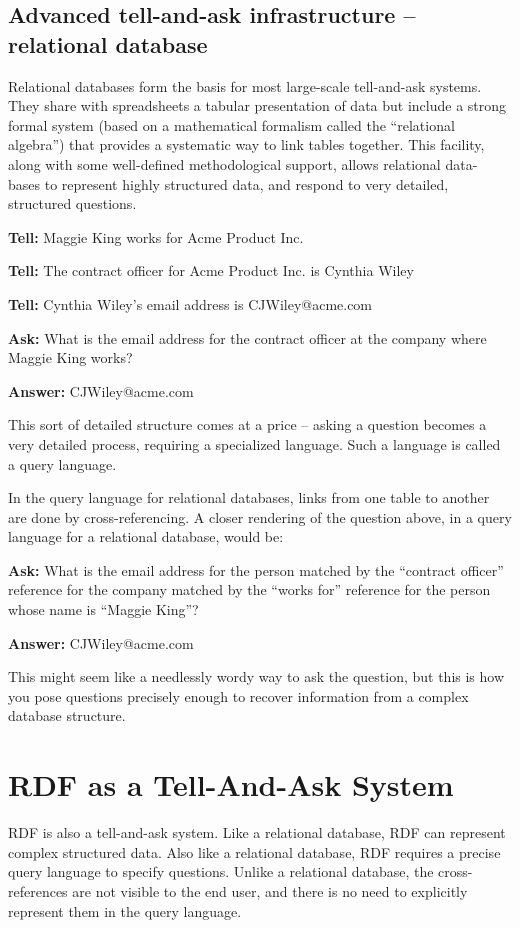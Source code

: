 \subsection{Advanced tell-and-ask infrastructure -- relational database}

Relational databases form the basis for most large-scale tell-and-ask
systems. They share with spreadsheets a tabular presentation of data but
include a strong formal system (based on a mathematical formalism called
the ``relational algebra'') that provides a systematic way to link
tables together. This facility, along with some well-defined
methodological support, allows relational data- bases to represent
highly structured data, and respond to very detailed, structured
questions.

\textbf{Tell:} Maggie King works for Acme Product Inc.

\textbf{Tell:} The contract officer for Acme Product Inc. is Cynthia Wiley

\textbf{Tell:} Cynthia Wiley's email address is
CJWiley@acme.com

\textbf{Ask:} What is the email address for the contract officer at the company
where Maggie King works?

\textbf{Answer:}
CJWiley@acme.com

This sort of detailed structure comes at a price -- asking a question
becomes a very detailed process, requiring a specialized language. Such
a language is called a query language.

In the query language for relational databases, links from one table to
another are done by cross-referencing.  A closer rendering of the
question above, in a query language for a relational database, would be:

\textbf{Ask:} What is the email address for the person matched by the ``contract
officer'' reference for the company matched by the ``works for''
reference for the person whose name is ``Maggie King''? 

\textbf{Answer:}
CJWiley@acme.com

This might seem like a needlessly wordy way to ask the question, but
this is how you pose questions precisely enough to recover information
from a complex database structure.

\section{RDF as a Tell-And-Ask System}

RDF is also a tell-and-ask system. Like a relational database, RDF can
represent complex structured data. Also like a relational database, RDF
requires a precise query language to specify questions. Unlike a
relational database, the cross-references are not visible to the end
user, and there is no need to explicitly represent them in the query
language.

